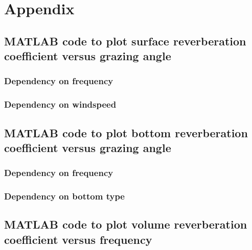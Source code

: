 
\chapter{Appendix} \label{Appendix}

\section{ MATLAB code to plot surface reverberation coefficient versus grazing angle } \label{ MATLAB code to plot Surface reverberation coefficient versus grazing angle }

\subsection{ Dependency on frequency } \label{ Dependency on frequency } 



\subsection{ Dependency on windspeed } \label{ Dependency on windspeed } 


\section{ MATLAB code to plot bottom reverberation coefficient versus grazing angle } \label{ MATLAB code to plot bottom reverberation coefficient versus grazing angle }

\subsection{ Dependency on frequency } \label{ Dependency on frequency } 


\subsection{ Dependency on bottom type } \label{ Dependency on bottom type } 


\section{ MATLAB code to plot volume reverberation coefficient versus frequency } \label{ MATLAB code to plot volume reverberation coefficient versus frequency }

